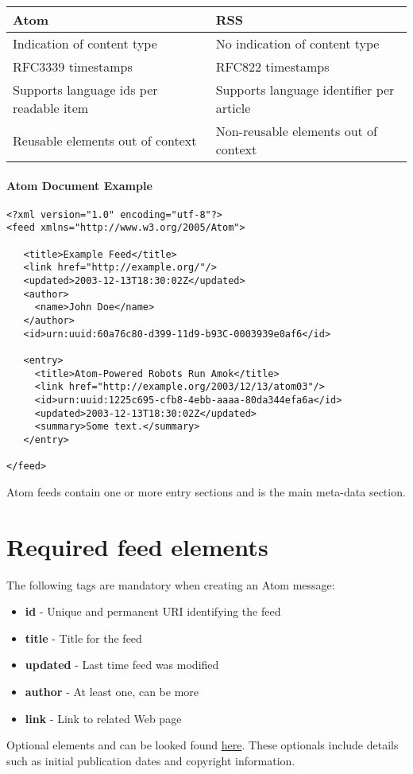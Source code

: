 \begin{tabular}{|l|l|}
\hline
Atom & RSS \\ \hline
Indication of content type & No indication of content type \\
RFC3339 timestamps & RFC822 timestamps \\
Supports language ids per readable item & Supports language identifier per article \\
Reusable elements out of context & Non-reusable elements out of context \\
\hline
\end{tabular}

\paragraph{Atom Document Example}
\begin{verbatim}
<?xml version="1.0" encoding="utf-8"?>
<feed xmlns="http://www.w3.org/2005/Atom">

   <title>Example Feed</title>
   <link href="http://example.org/"/>
   <updated>2003-12-13T18:30:02Z</updated>
   <author>
     <name>John Doe</name>
   </author>
   <id>urn:uuid:60a76c80-d399-11d9-b93C-0003939e0af6</id>

   <entry>
     <title>Atom-Powered Robots Run Amok</title>
     <link href="http://example.org/2003/12/13/atom03"/>
     <id>urn:uuid:1225c695-cfb8-4ebb-aaaa-80da344efa6a</id>
     <updated>2003-12-13T18:30:02Z</updated>
     <summary>Some text.</summary>
   </entry>

</feed>
\end{verbatim}

Atom feeds contain one or more entry sections and is the main meta-data section.

\section{Required feed elements}
The following tags are mandatory when creating an Atom message:
\begin{itemize}
  \item \textbf{id} - Unique and permanent URI identifying the feed
  \item \textbf{title} - Title for the feed
  \item \textbf{updated} - Last time feed was modified
  \item \textbf{author} - At least one, can be more
  \item \textbf{link} - Link to related Web page
\end{itemize}

Optional elements and can be looked found \href{http://www.atomenabled.org/developers/syndication/#optionalEntryElements}{here}. These optionals include details such as initial publication dates and copyright information.

%
